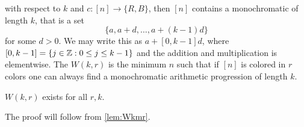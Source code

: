  with respect to $k$ and $c:[n]\to \{R,B\}$, then $[n]$ contains a monochromatic  of length $k$, that is a set
\[
\{ a, a+d ,\dotsc, a+(k-1)d\}
\]
for some $d>0$. We may write this as $a + [0,k-1]d$, where $[0,k-1] = \{ j\in \mathbb{Z}: 0\leq j\leq k-1\}$ and the addition and multiplication is elementwise. The  $W(k,r)$ is the minimum $n$ such that if $[n]$ is colored in $r$ colors one can always find a monochromatic arithmetic progression of length $k$.

\begin{theorem}
$W(k,r)$ exists for all $r,k$. \label{thm:VdW}
\end{theorem}
The proof will follow from \cref{lem:Wkmr}.
